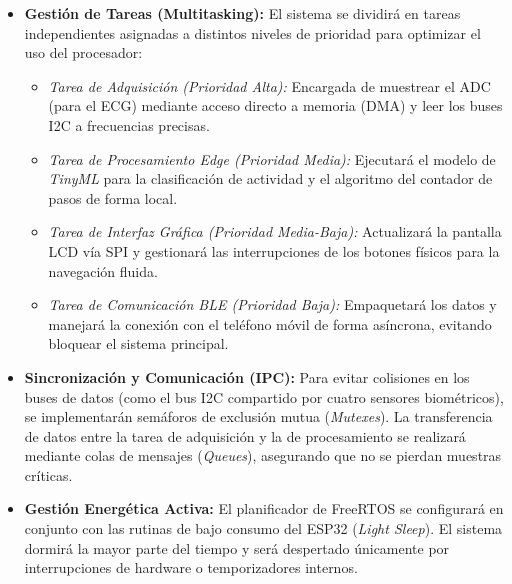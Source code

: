 \documentclass[letterpaper,11pt]{article}
\begin{document}
\begin{itemize}
    \item \textbf{Gestión de Tareas (Multitasking):} El sistema se dividirá en tareas independientes asignadas a distintos niveles de prioridad para optimizar el uso del procesador:
          \begin{itemize}
              \item \textit{Tarea de Adquisición (Prioridad Alta):} Encargada de muestrear el ADC (para el ECG) mediante acceso directo a memoria (DMA) y leer los buses I2C a frecuencias precisas.
              \item \textit{Tarea de Procesamiento Edge (Prioridad Media):} Ejecutará el modelo de \textit{TinyML} para la clasificación de actividad y el algoritmo del contador de pasos de forma local.
              \item \textit{Tarea de Interfaz Gráfica (Prioridad Media-Baja):} Actualizará la pantalla LCD vía SPI y gestionará las interrupciones de los botones físicos para la navegación fluida.
              \item \textit{Tarea de Comunicación BLE (Prioridad Baja):} Empaquetará los datos y manejará la conexión con el teléfono móvil de forma asíncrona, evitando bloquear el sistema principal.
          \end{itemize}
    \item \textbf{Sincronización y Comunicación (IPC):} Para evitar colisiones en los buses de datos (como el bus I2C compartido por cuatro sensores biométricos), se implementarán semáforos de exclusión mutua (\textit{Mutexes}). La transferencia de datos entre la tarea de adquisición y la de procesamiento se realizará mediante colas de mensajes (\textit{Queues}), asegurando que no se pierdan muestras críticas.
    \item \textbf{Gestión Energética Activa:} El planificador de FreeRTOS se configurará en conjunto con las rutinas de bajo consumo del ESP32 (\textit{Light Sleep}). El sistema dormirá la mayor parte del tiempo y será despertado únicamente por interrupciones de hardware o temporizadores internos.
\end{itemize}
\end{document}
